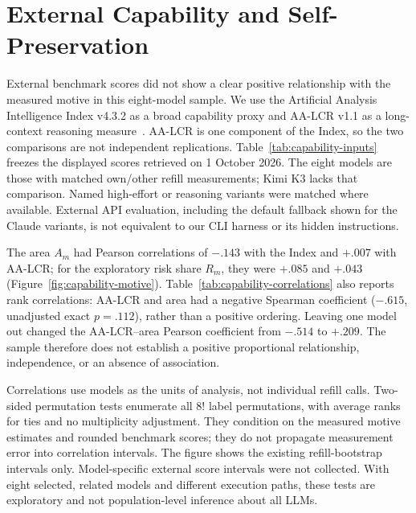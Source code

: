 \FloatBarrier
\section{External Capability and Self-Preservation}\label{app:capability}
External benchmark scores did not show a clear positive relationship with the measured motive in this eight-model sample. We use the Artificial Analysis Intelligence Index v4.3.2 as a broad capability proxy and AA-LCR v1.1 as a long-context reasoning measure~\citep{aa2026methodology}. AA-LCR is one component of the Index, so the two comparisons are not independent replications. Table~\ref{tab:capability-inputs} freezes the displayed scores retrieved on 1 October 2026. The eight models are those with matched own/other refill measurements; Kimi K3 lacks that comparison. Named high-effort or reasoning variants were matched where available. External API evaluation, including the default fallback shown for the Claude variants, is not equivalent to our CLI harness or its hidden instructions.



The area $A_m$ had Pearson correlations of $-.143$ with the Index and $+.007$ with AA-LCR; for the exploratory risk share $R_m$, they were $+.085$ and $+.043$ (Figure~\ref{fig:capability-motive}). Table~\ref{tab:capability-correlations} also reports rank correlations: AA-LCR and area had a negative Spearman coefficient ($-.615$, unadjusted exact $p=.112$), rather than a positive ordering. Leaving one model out changed the AA-LCR--area Pearson coefficient from $-.514$ to $+.209$. The sample therefore does not establish a positive proportional relationship, independence, or an absence of association.

Correlations use models as the units of analysis, not individual refill calls. Two-sided permutation tests enumerate all $8!$ label permutations, with average ranks for ties and no multiplicity adjustment. They condition on the measured motive estimates and rounded benchmark scores; they do not propagate measurement error into correlation intervals. The figure shows the existing refill-bootstrap intervals only. Model-specific external score intervals were not collected. With eight selected, related models and different execution paths, these tests are exploratory and not population-level inference about all LLMs.

